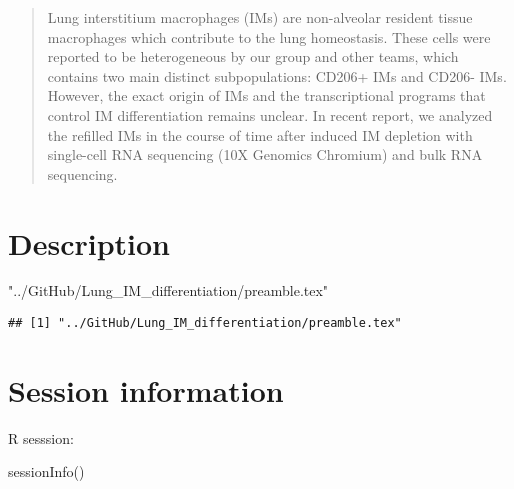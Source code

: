 \documentclass[smallextended]{svjour3}       %
\newenvironment{Shaded}{\begin{snugshade}}{\end{snugshade}}
\newcommand{\FunctionTok}[1]{\textcolor[rgb]{0.00,0.00,0.00}{#1}}
\newcommand{\NormalTok}[1]{#1}
\newcommand{\StringTok}[1]{\textcolor[rgb]{0.31,0.60,0.02}{#1}}
\begin{document}
\begin{abstract}
Lung interstitium macrophages (IMs) are non-alveolar resident tissue macrophages which contribute to the lung homeostasis. These cells were reported to be heterogeneous by our group and other teams, which contains two main distinct subpopulations: CD206+ IMs and CD206- IMs. However, the exact origin of IMs and the transcriptional programs that control IM differentiation remains unclear. In recent report, we analyzed the refilled IMs in the course of time after induced IM depletion with single-cell RNA sequencing (10X Genomics Chromium) and bulk RNA sequencing.
\\


\end{abstract}


\def\spacingset#1{\renewcommand{\baselinestretch}%
{#1}\small\normalsize} \spacingset{1}


\newpage

\hypertarget{description}{%
\section{Description}\label{description}}

\begin{Shaded}
\begin{Highlighting}[]
\StringTok{"../GitHub/Lung\_IM\_differentiation/preamble.tex"}
\end{Highlighting}
\end{Shaded}

\begin{verbatim}
## [1] "../GitHub/Lung_IM_differentiation/preamble.tex"
\end{verbatim}

\hypertarget{session-information}{%
\section{Session information}\label{session-information}}

R sesssion:

\begin{Shaded}
\begin{Highlighting}[]
\FunctionTok{sessionInfo}\NormalTok{()}
\end{Highlighting}
\end{Shaded}
\end{document}
